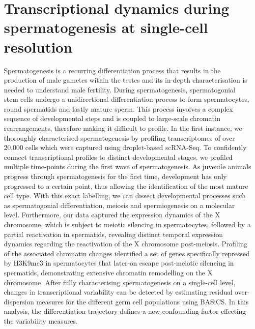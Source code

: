 
\chapter{Transcriptional dynamics during spermatogenesis at single-cell resolution}  

\graphicspath{{Chapter3/Figures/}}

\vspace*{\fill}

\begin{Abstract}
Spermatogenesis is a recurring differentiation process that results in the production of male gametes within the testes and its in-depth characterisation is needed to understand male fertility. During spermatogenesis, spermatogonial stem cells undergo a unidirectional differentiation process to form spermatocytes, round spermatids and lastly mature sperm. This process involves a complex sequence of developmental steps and is coupled to large-scale chromatin rearrangements, therefore making it difficult to profile.
In the first instance, we thoroughly characterised spermatogenesis by   profiling transcriptomes of over 20,000 cells which were captured using droplet-based scRNA-Seq. To confidently connect transcriptional profiles to distinct developmental stages, we profiled multiple time-points during the first wave of spermatogenesis. As juvenile animals progress through spermatogenesis for the first time, development has only progressed to a certain point, thus allowing the identification of the most mature cell type. With this exact labelling, we can dissect developmental processes such as spermatogonial differentiation, meiosis and spermiogenesis on a molecular level. Furthermore, our data captured the expression dynamics of the X chromosome, which is subject to meiotic silencing in spermatocytes, followed by a partial reactivation in spermatids, revealing distinct temporal expression dynamics regarding the reactivation of the X chromosome post-meiosis. Profiling of the associated chromatin changes identified a set of genes specifically repressed by H3K9me3 in spermatocytes that later-on escape post-meiotic silencing in spermatids, demonstrating extensive chromatin remodelling on the X chromosome. After fully characterising spermatogenesis on a single-cell level, changes in transcriptional variability can be detected by estimating residual over-dispersion measures for the different germ cell populations using BASiCS. In this analysis, the differentiation trajectory defines a new confounding factor effecting the variability measures.  
\end{Abstract}

